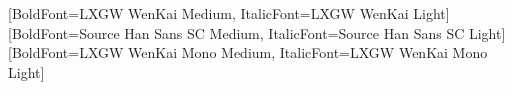 \newfontfamily{}




[BoldFont={LXGW WenKai Medium}, ItalicFont={LXGW WenKai Light}]
[BoldFont={Source Han Sans SC Medium}, ItalicFont={Source Han Sans SC Light}]
[BoldFont={LXGW WenKai Mono Medium}, ItalicFont={LXGW WenKai Mono Light}]


